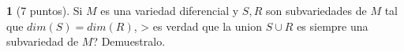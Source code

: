 \documentclass[12pt,a4paper]{report}
\theoremstyle{definition}
\newtheorem{ex}{}
\begin{document}
\begin{ex}[7 puntos]
Si $M$ es una variedad diferencial y $S,R$ son subvariedades de $M$ tal que $dim(S)=dim(R)$, > es verdad que la union $S\cup R$ es siempre  una subvariedad de $M$? Demuestralo.
\end{ex}

 







 
\end{document}
